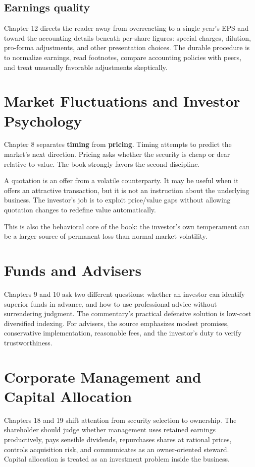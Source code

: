\documentclass[11pt]{article}
\begin{document}
\subsection{Earnings quality}
Chapter 12 directs the reader away from overreacting to a single year's EPS and toward the accounting details beneath per-share figures: special charges, dilution, pro-forma adjustments, and other presentation choices. The durable procedure is to normalize earnings, read footnotes, compare accounting policies with peers, and treat unusually favorable adjustments skeptically.

\section{Market Fluctuations and Investor Psychology}
Chapter 8 separates \textbf{timing} from \textbf{pricing}. Timing attempts to predict the market's next direction. Pricing asks whether the security is cheap or dear relative to value. The book strongly favors the second discipline.

\begin{principlebox}
A quotation is an offer from a volatile counterparty. It may be useful when it offers an attractive transaction, but it is not an instruction about the underlying business. The investor's job is to exploit price/value gaps without allowing quotation changes to redefine value automatically.
\end{principlebox}

This is also the behavioral core of the book: the investor's own temperament can be a larger source of permanent loss than normal market volatility.

\section{Funds and Advisers}
Chapters 9 and 10 ask two different questions: whether an investor can identify superior funds in advance, and how to use professional advice without surrendering judgment. The commentary's practical defensive solution is low-cost diversified indexing. For advisers, the source emphasizes modest promises, conservative implementation, reasonable fees, and the investor's duty to verify trustworthiness.

\section{Corporate Management and Capital Allocation}
Chapters 18 and 19 shift attention from security selection to ownership. The shareholder should judge whether management uses retained earnings productively, pays sensible dividends, repurchases shares at rational prices, controls acquisition risk, and communicates as an owner-oriented steward. Capital allocation is treated as an investment problem inside the business.
\end{document}
